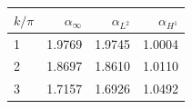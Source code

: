 \begin{tabular}{lrrr}
\toprule
\(k/\pi\) & \(\alpha_\infty\) & \(\alpha_{L^2}\) & \(\alpha_{H^1}\) \\
\midrule
1 & 1.9769 & 1.9745 & 1.0004 \\
2 & 1.8697 & 1.8610 & 1.0110 \\
3 & 1.7157 & 1.6926 & 1.0492 \\
\bottomrule
\end{tabular}
